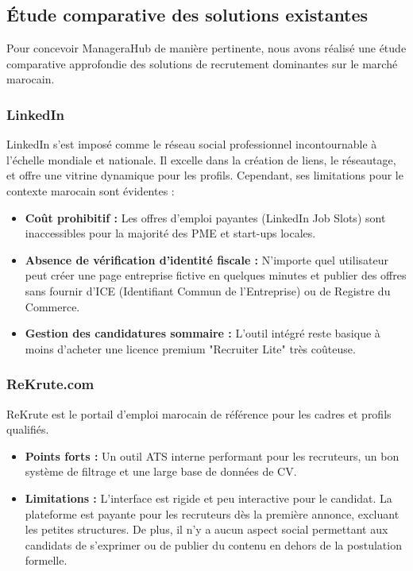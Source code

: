 \subsection{Étude comparative des solutions existantes}
Pour concevoir ManageraHub de manière pertinente, nous avons réalisé une étude comparative approfondie des solutions de recrutement dominantes sur le marché marocain.

\subsubsection{LinkedIn}
LinkedIn s'est imposé comme le réseau social professionnel incontournable à l'échelle mondiale et nationale. Il excelle dans la création de liens, le réseautage, et offre une vitrine dynamique pour les profils. Cependant, ses limitations pour le contexte marocain sont évidentes :
\begin{itemize}
    \item \textbf{Coût prohibitif :} Les offres d'emploi payantes (LinkedIn Job Slots) sont inaccessibles pour la majorité des PME et start-ups locales.
    \item \textbf{Absence de vérification d'identité fiscale :} N'importe quel utilisateur peut créer une page entreprise fictive en quelques minutes et publier des offres sans fournir d'ICE (Identifiant Commun de l'Entreprise) ou de Registre du Commerce.
    \item \textbf{Gestion des candidatures sommaire :} L'outil intégré reste basique à moins d'acheter une licence premium "Recruiter Lite" très coûteuse.
\end{itemize}

\subsubsection{ReKrute.com}
ReKrute est le portail d'emploi marocain de référence pour les cadres et profils qualifiés.
\begin{itemize}
    \item \textbf{Points forts :} Un outil ATS interne performant pour les recruteurs, un bon système de filtrage et une large base de données de CV.
    \item \textbf{Limitations :} L'interface est rigide et peu interactive pour le candidat. La plateforme est payante pour les recruteurs dès la première annonce, excluant les petites structures. De plus, il n'y a aucun aspect social permettant aux candidats de s'exprimer ou de publier du contenu en dehors de la postulation formelle.
\end{itemize}

